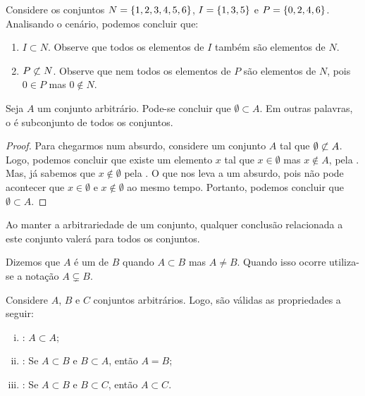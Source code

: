 \begin{example}
Considere os conjuntos $N = \left\{ 1, 2, 3, 4, 5, 6\right\}$, $I = \left\{ 1, 3, 5\right\}$ e $P = \left\{ 0, 2, 4, 6\right\}$.
Analisando o cenário, podemos concluir que:
	\begin{enumerate}
		\item $I \subset N$. Observe que todos os elementos de $I$ também são elementos de $N$.
		\item $P \not\subset N$. Observe que nem todos os elementos de $P$ são elementos de $N$, pois $0 \in P$ mas $0 \notin N$.
	\end{enumerate}
\end{example}

\begin{proposition}
	\label{prop:emptyset1}
Seja $A$ um conjunto arbitrário. Pode-se concluir que $\emptyset \subset A$.
Em outras palavras, o  é subconjunto de todos os conjuntos.
\end{proposition}

\begin{proof}
Para chegarmos num absurdo, considere um conjunto $A$ tal que $\emptyset \not\subset A$.
Logo, podemos concluir que existe um elemento $x$ tal que $x \in \emptyset$ mas $x \notin A$, pela .
Mas, já sabemos que $x \notin \emptyset$ pela .
O que nos leva a um absurdo, pois não pode acontecer que $x \in \emptyset$ e $x \notin \emptyset$ ao mesmo tempo.
Portanto, podemos concluir que $\emptyset \subset A$.
\end{proof}

\begin{remark}
Ao manter a arbitrariedade de um conjunto, qualquer conclusão relacionada a este conjunto valerá para todos os conjuntos.
\end{remark}

\begin{definition}
Dizemos que $A$ é um  de $B$ quando $A \subset B$ mas $A \neq B$. Quando isso ocorre utiliza-se a notação $A \subsetneq B$.
\end{definition}

\begin{proposition}
Considere $A$, $B$ e $C$ conjuntos arbitrários. Logo, são válidas as propriedades a seguir:

\begin{enumerate}[i)]
\item
	\label{inclusao:reflexividade}
	: $A \subset A$;
\item
	\label{inclusao:antissimetria}
	: Se $A \subset B$ e $B \subset A$, então $A = B$;
\item
	\label{inclusao:transitividade}
	: Se $A \subset B$ e $B \subset C$, então $A \subset C$.
\end{enumerate}
\end{proposition}

